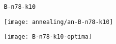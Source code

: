 \begin{figure}[H]
	\begin{minipage}{0.15\textwidth}
		\centering
		\texttt{B-n78-k10}
	\end{minipage}%
	\begin{minipage}{0.40\textwidth}
		\centering
		\texttt{[image: annealing/an-B-n78-k10]}\par
	\end{minipage}%
	\hspace{0.03\textwidth}
	\begin{minipage}{0.40\textwidth}
		\centering
		\texttt{[image: B-n78-k10-optima]}\par
	\end{minipage}%
\end{figure}
